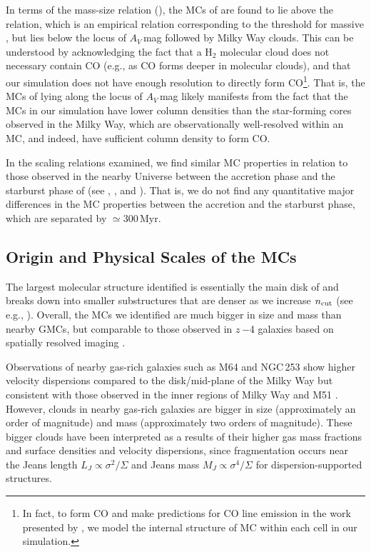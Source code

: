 \IfFileExists{emulateapjlegacy.cls}{\documentclass[iop]{emulateapjlegacy}}{\documentclass[iop]{emulateapj}}
\begin{document}
In terms of the mass-size relation (), the MCs of \flower are found to lie above the \citet{Kauffmann10c} relation, 
which is an empirical relation corresponding to the threshold for massive \SF, but lies
below the locus of $A_V$\,mag followed by Milky Way clouds.
This can be understood by acknowledging the fact that a H$_2$ molecular cloud
does not necessary contain CO (e.g., as CO forms deeper in molecular clouds),
and that our simulation does not have enough resolution to directly form CO\footnote{
In fact, to form CO and make predictions for CO line emission in the work presented by \citet{Vallini18a}, we
model the internal structure of MC within each cell in our simulation.}.
That is, the MCs of \flower lying along the locus of $A_V$\,mag likely manifests from the
fact that the MCs in our simulation have lower column densities than the star-forming cores observed in the Milky Way, which are
observationally well-resolved within an MC, and indeed, have sufficient column density to form CO.


In the scaling relations examined, we find similar MC properties 
in relation to those observed in the nearby Universe between the accretion phase and the starburst phase of
\flower (see , , and ).
That is, we do not find any quantitative major differences in the MC properties between the accretion and the starburst phase, which
are separated by $\simeq$300\,Myr.

 
\subsection{Origin and Physical Scales of the MCs} \label{sec:origin} 
The largest molecular structure identified is essentially the main disk of \flower and breaks down into smaller
substructures that are denser as we increase $n_{\rm cut}$ (see e.g., ). Overall,
the MCs we identified are much bigger in size and mass than nearby GMCs, 
but comparable to those observed in $z$\,$-$4 galaxies based on spatially resolved imaging \citep{Swinbank11a}.

Observations of nearby gas-rich galaxies such as M64 and NGC\,253
show higher velocity dispersions compared
to the disk/mid-plane of the Milky Way but consistent with those observed in the inner regions of
Milky Way and M51 \citep{Oka01a, Rosolowsky05a, Heyer09a, Hughes13b, Leroy15a, Rice16a}.  %
However, clouds in nearby gas-rich galaxies are bigger in size (approximately
an order of magnitude) and mass (approximately two orders of magnitude).
These bigger clouds have been interpreted as a results of their 
higher gas mass fractions and
surface densities and velocity dispersions, since
fragmentation occurs near the Jeans length $L_J\propto\sigma^2/\Sigma$
and Jeans mass $M_J\propto\sigma^4/\Sigma$
for dispersion-supported structures.
\end{document}
